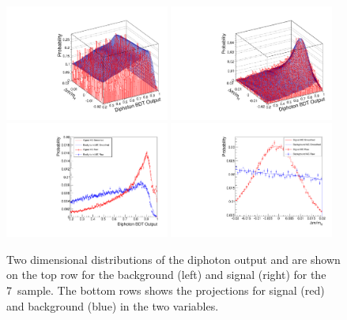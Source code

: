 \begin{figure}
  \includegraphics[width=0.48\textwidth]{selec_and_cats/plots/sideband_bkg_7TeV_fix.pdf}
  \includegraphics[width=0.48\textwidth]{selec_and_cats/plots/sideband_sig_7TeV_fix.pdf} \\
  \includegraphics[width=0.48\textwidth]{selec_and_cats/plots/sideband_diphobdt_7TeV_fix.pdf}
  \includegraphics[width=0.48\textwidth]{selec_and_cats/plots/sideband_dmom_7TeV_fix.pdf} \\
  \caption[Two dimensional distributions of the diphoton \acs{BDT} output and \dmom for the sideband analysis]{Two dimensional distributions of the diphoton \BDT output and \dmom are shown on the top row for the background (left) and signal (right) for the 7~\TeV sample. The bottom rows shows the projections for signal (red) and background (blue) in the two variables.}
  \label{fig:sideband_inputs}
\end{figure}

